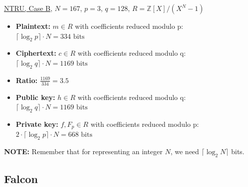 \begin{table}[H]
\centering
\small
\renewcommand{\arraystretch}{1.35}
\caption{Size of plaintexts, ciphertexts and keys in bits.}
\end{table}

\noindent
\underline{NTRU, Case B}, $N=167$, $p=3$, $q=128$, $R = \mathbb{Z}[X]/(X^N-1)$
\medskip

\begin{itemize}
    \item \textbf{Plaintext:} $m \in R$ with coefficients reduced modulo p:\\ $\lceil \log_2 p \rceil \cdot N = 334 \text{ bits}$
    \item \textbf{Ciphertext:} $c \in R$ with coefficients reduced modulo q:\\ $\lceil \log_2 q \rceil \cdot N = 1169 \text{ bits}$
    \item \textbf{Ratio:} $\frac{1169}{334} = 3.5$
    \item \textbf{Public key:} $h \in R$ with coefficients reduced modulo q:\\ $\lceil \log_2 q \rceil \cdot N = 1169 \text{ bits}$
    \item \textbf{Private key:} $f, F_p \in R$ with coefficients reduced modulo p:\\ $2 \cdot \lceil \log_2 p \rceil \cdot N = 668 \text{ bits}$
\end{itemize}
\medskip

\noindent
\textbf{NOTE:} Remember that for representing an integer $N$, we need $\lceil \log_2 N \rceil$ bits.

\newpage
\subsection{Falcon}


